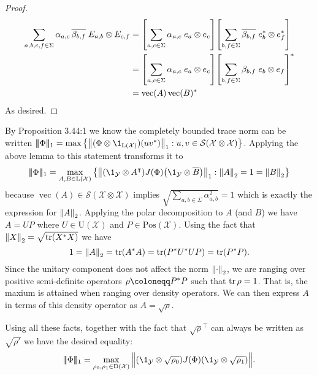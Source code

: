 \documentclass[boxes,pages,color=SeaGreen]{homework}
\renewcommand{\vec}{\operatorname{vec}}
\newcommand{\X}{\mathcal{X}}
\newcommand{\Y}{\mathcal{Y}}
\newcommand{\Lin}{\mathrm{L}}
\newcommand{\Pos}{\mathrm{Pos}}
\newcommand{\Unitary}{\mathrm{U}}
\newcommand{\Density}{\mathrm{D}}
\newcommand{\triplenorm}[1]{
  \lvert\!\lvert\!\lvert #1 
  \rvert\!\rvert\!\rvert}
\begin{document}
\begin{solution}
\begin{proof}
        \begin{align*}
            \sum_{a,b,c,f\in\Sigma}\alpha_{a,c}\,\overline{\beta_{b,f}}\;E_{a,b}\otimes E_{c,f} & = \qty[\sum_{a,c\in\Sigma}\alpha_{a,c}\;e_a\otimes e_c]\qty[\sum_{b,f\in\Sigma}\overline{\beta_{b,f}}\;e_b^*\otimes e_f^*] \\
                                                                                                & = \qty[\sum_{a,c\in\Sigma}\alpha_{a,c}\;e_a\otimes e_c]\qty[\sum_{b,f\in\Sigma}\beta_{b,f}\;e_b\otimes e_f]^*              \\
                                                                                                & = \vec(A)\vec(B)^*
        \end{align*}
        As desired.
    \end{proof}
    By Proposition 3.44:1 we know the completely bounded trace norm can be written $\triplenorm{\Phi}_1 = \max\qty{\norm{(\Phi\otimes\1_{\Lin(\X)})(uv^*)}_1: u,v\in\mathcal{S}(\X\otimes\X)}$.
    Applying the above lemma to this statement transforms it to
    \begin{equation*}
        \triplenorm{\Phi}_1 = \max_{A,B\in\Lin(\X)}\qty{\norm{\qty(\1_\Y\otimes A^\intercal)J(\Phi)\qty(\1_\Y\otimes\overline{B})}_1 : \norm{A}_2 = 1 = \norm{B}_2}
    \end{equation*}
    because $\vec(A)\in\mathcal{S}(\X\otimes\X)$ implies $\sqrt{\sum_{a,b\in\Sigma}\alpha_{a,b}^2} = 1$ which is exactly the expression for $\norm{A}_2$.
    Applying the polar decomposition to $A$ (and $B$) we have $A = UP$ where $U\in\Unitary(\X)$ and $P\in\Pos(\X)$.
    Using the fact that $\norm{X}_2 = \sqrt{\tr(X^*X)}$ we have
    \begin{equation*}
        1 = \norm{A}_2 = \tr(A^*A) = \tr(P^*U^*UP) = \tr(P^*P).
    \end{equation*}
    Since the unitary component does not affect the norm $\norm{\cdot}_2$, we are ranging over positive semi-definite operators $\rho \defeq P^*P$ such that $\tr \rho = 1$.
    That is, the maxium is attained when ranging over density operators.
    We can then express $A$ in terms of this density operator as $A = \sqrt{\rho}$.

    Using all these facts, together with the fact that $\sqrt{\rho}^\intercal$ can always be written as $\sqrt{\rho'}$ we have the desired equality:
    \begin{equation*}
        \triplenorm{\Phi}_1 = \max_{\rho_0,\rho_1\in\Density(\X)} \norm\Big{\qty(\1_\Y\otimes\sqrt{\rho_0})J(\Phi)\qty(\1_\Y\otimes\sqrt{\rho_1})}.
    \end{equation*}
\end{solution}
\end{document}
